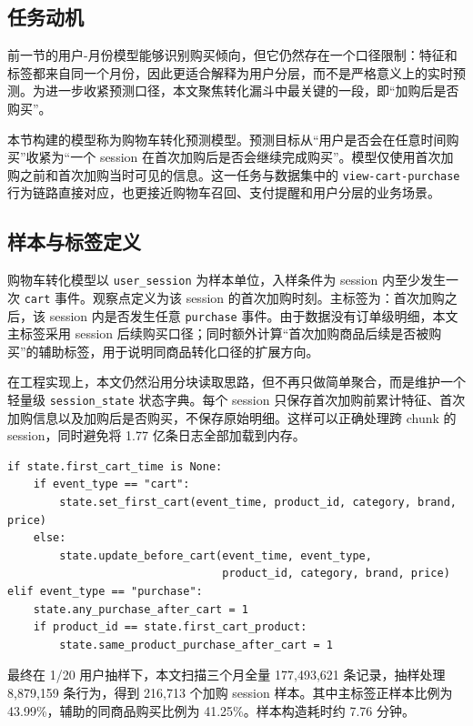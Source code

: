 \documentclass[12pt,hyperref,a4paper,UTF8]{ctexart}
\begin{document}
\subsection{任务动机}

前一节的用户-月份模型能够识别购买倾向，但它仍然存在一个口径限制：特征和标签都来自同一个月份，因此更适合解释为用户分层，而不是严格意义上的实时预测。为进一步收紧预测口径，本文聚焦转化漏斗中最关键的一段，即“加购后是否购买”。

本节构建的模型称为购物车转化预测模型。预测目标从“用户是否会在任意时间购买”收紧为“一个 session 在首次加购后是否会继续完成购买”。模型仅使用首次加购之前和首次加购当时可见的信息。这一任务与数据集中的 \texttt{view-cart-purchase} 行为链路直接对应，也更接近购物车召回、支付提醒和用户分层的业务场景。

\subsection{样本与标签定义}

购物车转化模型以 \texttt{user\_session} 为样本单位，入样条件为 session 内至少发生一次 \texttt{cart} 事件。观察点定义为该 session 的首次加购时刻。主标签为：首次加购之后，该 session 内是否发生任意 \texttt{purchase} 事件。由于数据没有订单级明细，本文主标签采用 session 后续购买口径；同时额外计算“首次加购商品后续是否被购买”的辅助标签，用于说明同商品转化口径的扩展方向。

在工程实现上，本文仍然沿用分块读取思路，但不再只做简单聚合，而是维护一个轻量级 \texttt{session\_state} 状态字典。每个 session 只保存首次加购前累计特征、首次加购信息以及加购后是否购买，不保存原始明细。这样可以正确处理跨 chunk 的 session，同时避免将 1.77 亿条日志全部加载到内存。

\begin{lstlisting}[caption={购物车转化样本的状态更新思路}]
if state.first_cart_time is None:
    if event_type == "cart":
        state.set_first_cart(event_time, product_id, category, brand, price)
    else:
        state.update_before_cart(event_time, event_type,
                                 product_id, category, brand, price)
elif event_type == "purchase":
    state.any_purchase_after_cart = 1
    if product_id == state.first_cart_product:
        state.same_product_purchase_after_cart = 1
\end{lstlisting}

最终在 1/20 用户抽样下，本文扫描三个月全量 177,493,621 条记录，抽样处理 8,879,159 条行为，得到 216,713 个加购 session 样本。其中主标签正样本比例为 43.99\%，辅助的同商品购买比例为 41.25\%。样本构造耗时约 7.76 分钟。
\end{document}
